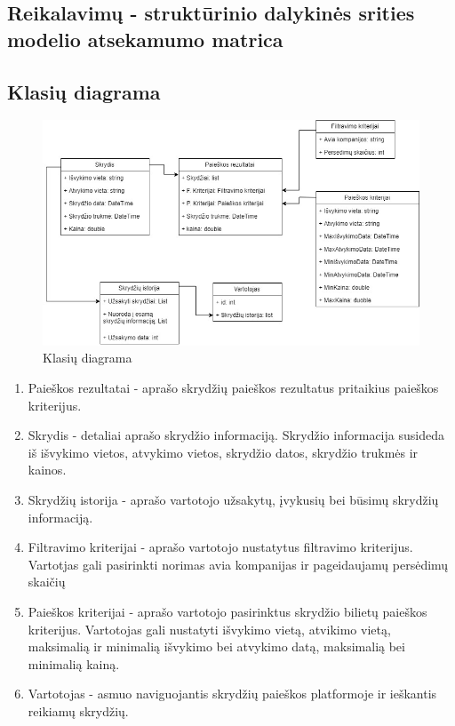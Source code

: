 \documentclass{VUMIFPSkursinis}
\begin{document}
            \subsection{Reikalavimų - struktūrinio dalykinės srities modelio atsekamumo matrica}
            \subsection{Klasių diagrama}
                \begin{figure}[H]
                    \centering
                    \includegraphics[scale=1]{img/class_diagram}
                    \caption{Klasių diagrama}
                    \label{klasių diagrama}
                \end{figure}
                \begin{enumerate}[label=\textbf{E\arabic*}.]
                    \item Paieškos rezultatai - aprašo skrydžių paieškos rezultatus pritaikius paieškos kriterijus.
                    \item Skrydis - detaliai aprašo skrydžio informaciją. Skrydžio informacija susideda iš išvykimo vietos, atvykimo vietos, skrydžio datos, skrydžio trukmės ir kainos.
                    \item Skrydžių istorija - aprašo vartotojo užsakytų, įvykusių bei būsimų skrydžių informaciją.
                    \item Filtravimo kriterijai - aprašo vartotojo nustatytus filtravimo kriterijus. Vartotjas gali pasirinkti norimas avia kompanijas ir pageidaujamų persėdimų skaičių
                    \item Paieškos kriterijai - aprašo vartotojo pasirinktus skrydžio bilietų paieškos kriterijus. Vartotojas gali nustatyti išvykimo vietą, atvikimo vietą, maksimalią ir minimalią išvykimo bei atvykimo datą, maksimalią bei minimalią kainą.
                    \item Vartotojas - asmuo naviguojantis skrydžių paieškos platformoje ir ieškantis reikiamų skrydžių.
                \end{enumerate}
      
\end{document}
